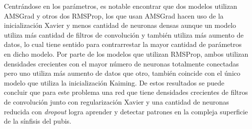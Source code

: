 \begin{table}[h]
\centering
{}
\caption[Nodule-98-30K-GS-*: Mejores hiperparámetros]{, hiperparámetros de los mejores modelos}
\label{table:nodule-98-30K-GS-_bestParams}
\end{table}

Centrándose en los parámetros, es notable encontrar que dos modelos utilizan AMSGrad y otros dos RMSProp, los que usan AMSGrad hacen uso de la inicialización Xavier y menos cantidad de neuronas densas aunque un modelo utiliza más cantidad de filtros de convolución y también utiliza más aumento de datos, lo cual tiene sentido para contrarrestar la mayor cantidad de parámetros en dicho modelo. Por parte de los modelos que utilizan RMSProp, ambos utilizan densidades crecientes con el mayor número de neuronas totalmente conectadas pero uno utiliza más aumento de datos que otro, también coincide con el único modelo que utiliza la inicialización Kaiming. De estos resultados se puede concluir que para este problema una red que tiene densidades crecientes de filtros de convolución junto con regularización Xavier y una cantidad de neuronas reducida con \textit{dropout} logra aprender y detectar patrones en la compleja superficie de la sínfisis del pubis.

